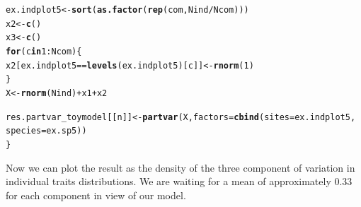 \documentclass[12pt]{article}\usepackage[]{graphicx}\usepackage[]{color}
\makeatletter
\newcommand{\hlnum}[1]{\textcolor[rgb]{0.686,0.059,0.569}{#1}}%
\newcommand{\hlopt}[1]{\textcolor[rgb]{0,0,0}{#1}}%
\newcommand{\hlstd}[1]{\textcolor[rgb]{0.345,0.345,0.345}{#1}}%
\newcommand{\hlkwa}[1]{\textcolor[rgb]{0.161,0.373,0.58}{\textbf{#1}}}%
\newcommand{\hlkwb}[1]{\textcolor[rgb]{0.69,0.353,0.396}{#1}}%
\newcommand{\hlkwc}[1]{\textcolor[rgb]{0.333,0.667,0.333}{#1}}%
\newcommand{\hlkwd}[1]{\textcolor[rgb]{0.737,0.353,0.396}{\textbf{#1}}}%
\newenvironment{kframe}{%
 \def\at@end@of@kframe{}%
 \ifinner\ifhmode%
  \def\at@end@of@kframe{\end{minipage}}%
  \begin{minipage}{\columnwidth}%
 \fi\fi%
 \def\FrameCommand##1{\hskip\@totalleftmargin \hskip-\fboxsep
 \colorbox{shadecolor}{##1}\hskip-\fboxsep
     \hskip-\linewidth \hskip-\@totalleftmargin \hskip\columnwidth}%
 \MakeFramed {\advance\hsize-\width
   \@totalleftmargin\z@ \linewidth\hsize
   \@setminipage}}%
 {\par\unskip\endMakeFramed%
 \at@end@of@kframe}
\newenvironment{knitrout}{}{} %
\makeatother
\begin{document}
\begin{knitrout}
\begin{kframe}
\begin{alltt}
 \hlstd{ex.indplot5} \hlkwb{<-} \hlkwd{sort}\hlstd{(}\hlkwd{as.factor}\hlstd{(}\hlkwd{rep}\hlstd{(com, Nind}\hlopt{/}\hlstd{Ncom)))}
 \hlstd{x2} \hlkwb{<-} \hlkwd{c}\hlstd{()}
 \hlstd{x3} \hlkwb{<-} \hlkwd{c}\hlstd{()}
 \hlkwa{for}\hlstd{(c} \hlkwa{in} \hlnum{1}\hlopt{:}\hlstd{Ncom)\{}
 \hlstd{x2[ex.indplot5} \hlopt{==} \hlkwd{levels}\hlstd{(ex.indplot5 )[c]]} \hlkwb{<-} \hlkwd{rnorm}\hlstd{(}\hlnum{1}\hlstd{)}
 \hlstd{\}}
 \hlstd{X} \hlkwb{<-} \hlkwd{rnorm}\hlstd{(Nind)} \hlopt{+} \hlstd{x1} \hlopt{+} \hlstd{x2}

 \hlstd{res.partvar_toymodel[[n]]} \hlkwb{<-} \hlkwd{partvar}\hlstd{(X,} \hlkwc{factors} \hlstd{=} \hlkwd{cbind}\hlstd{(}\hlkwc{sites} \hlstd{= ex.indplot5,}
               \hlkwc{species} \hlstd{= ex.sp5))}
\hlstd{\}}
\end{alltt}


{\ttfamily\noindent\itshape\color{messagecolor}{\#\# The partvar function decompose the variance accross nested scales. Thus choose the order of the factors very carefully!\\\#\# The partvar function decompose the variance accross nested scales. Thus choose the order of the factors very carefully!\\\#\# The partvar function decompose the variance accross nested scales. Thus choose the order of the factors very carefully!}}\end{kframe}
\end{knitrout}

Now we can plot the result as the density of the three component of variation in individual traits distributions. 
We are waiting for a mean of approximately 0.33 for each component in view of our model.
\end{document}

